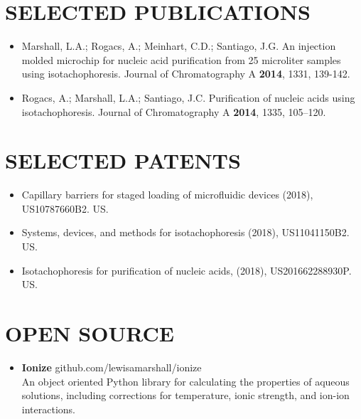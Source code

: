 \documentclass{res}
\begin{document}
\begin{resume}
 \section{SELECTED PUBLICATIONS}
  \begin{itemize}
  \item Marshall, L.A.; Rogacs, A.; Meinhart, C.D.; Santiago, J.G. An injection molded microchip for nucleic acid purification from 25 microliter samples using isotachophoresis. Journal of Chromatography A \textbf{2014}, 1331, 139-142.
  \item Rogacs, A.; Marshall, L.A.; Santiago, J.C. Purification of nucleic acids using isotachophoresis. Journal of Chromatography A \textbf{2014}, 1335, 105–120.
\end{itemize}

 \section{SELECTED PATENTS}
   \begin{itemize}
    \item Capillary barriers for staged loading of microfluidic devices (2018), US10787660B2. US.  
    \item Systems, devices, and methods for isotachophoresis (2018), US11041150B2. US.
    \item Isotachophoresis for purification of nucleic acids, (2018), US201662288930P. US. 
   \end{itemize}


 \section{OPEN SOURCE}
   \begin{itemize}
     \item \textbf{Ionize} github.com/lewisamarshall/ionize\\
   An object oriented Python library for calculating the properties of
   aqueous solutions, including corrections for temperature, ionic strength, and ion-ion interactions.
 \end{itemize}





\end{resume}
\end{document}
